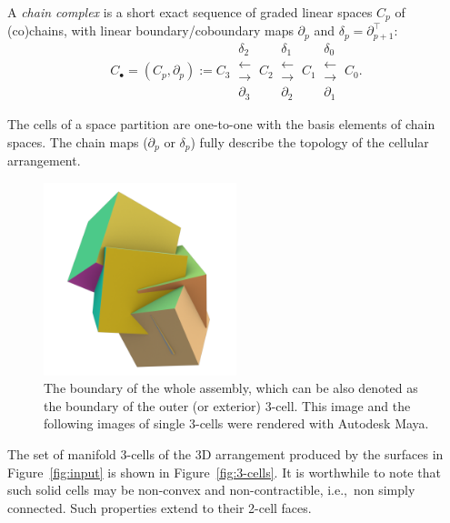 \documentclass[11pt, oneside]{amsart}   	%
\begin{document}
A \emph{chain complex} is a short exact sequence of graded linear spaces \(C_p\) of (co)chains, with linear
boundary/coboundary maps \(\partial_p\) and
\(\delta_p=\partial_{p+1}^\top\): 
\[ 
C_\bullet = (C_p, \partial_p) := 
C_3 \ 
\substack{
\delta_2 \\
\longleftarrow \\[-1mm]
\longrightarrow \\
\partial_3 
}
\ C_2 \ 
\substack{
\delta_1 \\
\longleftarrow \\[-1mm]
\longrightarrow \\
\partial_2 
}
\ C_1 \ 
\substack{
\delta_0 \\
\longleftarrow \\[-1mm]
\longrightarrow \\
\partial_1 
}
\ C_0 .
\] 

The cells of a space partition are one-to-one with the basis elements of chain spaces. The chain maps ($\partial_p$ or $\delta_p$) fully describe the topology of the cellular arrangement.

\begin{figure}[htbp] %
   \centering
   \includegraphics[width=0.5\textwidth]{images/0001.png}%
   \caption{The boundary of the whole assembly, which can be also denoted as the boundary of the outer (or exterior) 3-cell. This image and the following images of single 3-cells were rendered with Autodesk Maya.
   }
   \label{fig:example}
\end{figure}

The set of manifold 3-cells of the 3D arrangement produced by the surfaces in Figure~\ref{fig:input} is shown in Figure~\ref{fig:3-cells}. It is worthwhile to note that such solid cells may be non-convex and non-contractible, i.e.,~non simply connected. Such properties extend to their 2-cell faces. 
\end{document}
